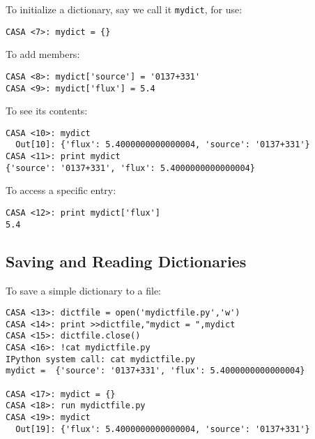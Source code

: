 To initialize a dictionary, say we call it {\tt mydict}, for use:
\small
\begin{verbatim}
CASA <7>: mydict = {}
\end{verbatim}
\normalsize

To add members:
\small
\begin{verbatim}
CASA <8>: mydict['source'] = '0137+331'
CASA <9>: mydict['flux'] = 5.4
\end{verbatim}
\normalsize

To see its contents:
\small
\begin{verbatim}
CASA <10>: mydict
  Out[10]: {'flux': 5.4000000000000004, 'source': '0137+331'}
CASA <11>: print mydict 
{'source': '0137+331', 'flux': 5.4000000000000004}
\end{verbatim}
\normalsize

To access a specific entry:
\small
\begin{verbatim}
CASA <12>: print mydict['flux']
5.4
\end{verbatim}
\normalsize

\subsection{Saving and Reading Dictionaries}
\label{section:python.dict.save}

To save a simple dictionary to a file:
\small
\begin{verbatim}
CASA <13>: dictfile = open('mydictfile.py','w')
CASA <14>: print >>dictfile,"mydict = ",mydict
CASA <15>: dictfile.close()
CASA <16>: !cat mydictfile.py
IPython system call: cat mydictfile.py
mydict =  {'source': '0137+331', 'flux': 5.4000000000000004}

CASA <17>: mydict = {}
CASA <18>: run mydictfile.py
CASA <19>: mydict
  Out[19]: {'flux': 5.4000000000000004, 'source': '0137+331'}
\end{verbatim}
\normalsize

